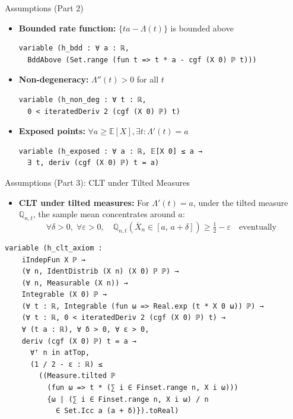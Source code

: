 \documentclass[aspectratio=169]{beamer}
\newcommand{\E}{\mathbb{E}}
\newcommand{\Q}{\mathbb{Q}}
\begin{document}
\begin{frame}[fragile]{Assumptions (Part 2)}
  \begin{itemize}
    \item \textbf{Bounded rate function:} $\{ta - \Lambda(t)\}$ is bounded above
\begin{lstlisting}[basicstyle=\ttfamily\scriptsize]
variable (h_bdd : ∀ a : ℝ,
  BddAbove (Set.range (fun t => t * a - cgf (X 0) ℙ t)))
\end{lstlisting}
    \item \textbf{Non-degeneracy:} $\Lambda''(t) > 0$ for all $t$
\begin{lstlisting}[basicstyle=\ttfamily\scriptsize]
variable (h_non_deg : ∀ t : ℝ,
  0 < iteratedDeriv 2 (cgf (X 0) ℙ) t)
\end{lstlisting}
    \item \textbf{Exposed points:} $\forall a \ge \E[X], \exists t: \Lambda'(t) = a$
\begin{lstlisting}[basicstyle=\ttfamily\scriptsize]
variable (h_exposed : ∀ a : ℝ, 𝔼[X 0] ≤ a →
  ∃ t, deriv (cgf (X 0) ℙ) t = a)
\end{lstlisting}
  \end{itemize}
\end{frame}

\begin{frame}[fragile]{Assumptions (Part 3): CLT under Tilted Measures}
  \begin{itemize}
    \item \textbf{CLT under tilted measures:} For $\Lambda'(t) = a$, under the tilted measure $\Q_{n,t}$, the sample mean concentrates around $a$:
      $$\forall \delta > 0,\; \forall \varepsilon > 0,\quad \Q_{n,t}\!\left(\overline{X}_n \in [a,\, a+\delta]\right) \geq \tfrac{1}{2} - \varepsilon \quad \text{eventually}$$
  \end{itemize}
\begin{lstlisting}[basicstyle=\ttfamily\scriptsize]
variable (h_clt_axiom :
    iIndepFun X ℙ →
    (∀ n, IdentDistrib (X n) (X 0) ℙ ℙ) →
    (∀ n, Measurable (X n)) →
    Integrable (X 0) ℙ →
    (∀ t : ℝ, Integrable (fun ω => Real.exp (t * X 0 ω)) ℙ) →
    (∀ t : ℝ, 0 < iteratedDeriv 2 (cgf (X 0) ℙ) t) →
    ∀ (t a : ℝ), ∀ δ > 0, ∀ ε > 0,
    deriv (cgf (X 0) ℙ) t = a →
      ∀ᶠ n in atTop,
      (1 / 2 - ε : ℝ) ≤
        ((Measure.tilted ℙ
          (fun ω => t * (∑ i ∈ Finset.range n, X i ω)))
          {ω | (∑ i ∈ Finset.range n, X i ω) / n
            ∈ Set.Icc a (a + δ)}).toReal)
\end{lstlisting}
\end{frame}
\end{document}
